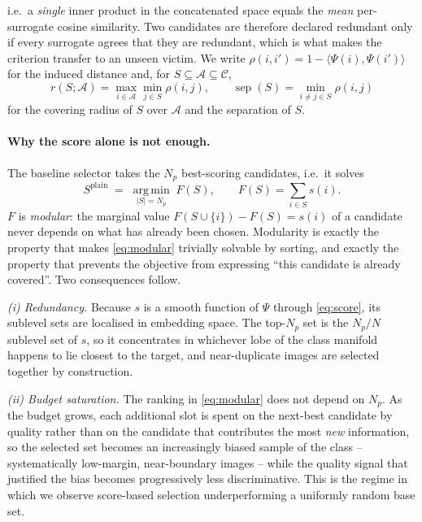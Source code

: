 i.e.\ a \emph{single} inner product in the concatenated space equals the
\emph{mean} per-surrogate cosine similarity.  Two candidates are therefore
declared redundant only if every surrogate agrees that they are redundant,
which is what makes the criterion transfer to an unseen victim.  We write
$\rho(i,i')=1-\langle\Psi(i),\Psi(i')\rangle$ for the induced distance and,
for $S\subseteq\mathcal{A}\subseteq\mathcal{C}$,
\begin{equation}
  r(S;\mathcal{A})=\max_{i\in\mathcal{A}}\min_{j\in S}\rho(i,j),
  \qquad
  \operatorname{sep}(S)=\min_{i\neq j\in S}\rho(i,j)
  \label{eq:radii}
\end{equation}
for the covering radius of $S$ over $\mathcal{A}$ and the separation of $S$.

\paragraph{Why the score alone is not enough.}
The baseline selector takes the $N_p$ best-scoring candidates, i.e.\ it solves
\begin{equation}
  S^{\mathrm{plain}}\;=\;\operatorname*{arg\,min}_{|S|=N_p}\;F(S),
  \qquad F(S)=\sum_{i\in S}s(i).
  \label{eq:modular}
\end{equation}
$F$ is \emph{modular}: the marginal value $F(S\cup\{i\})-F(S)=s(i)$ of a
candidate never depends on what has already been chosen.  Modularity is
exactly the property that makes \eqref{eq:modular} trivially solvable by
sorting, and exactly the property that prevents the objective from expressing
``this candidate is already covered''.  Two consequences follow.

\emph{(i) Redundancy.}  Because $s$ is a smooth function of $\Psi$ through
\eqref{eq:score}, its sublevel sets are localised in embedding space.  The
top-$N_p$ set is the $N_p/N$ sublevel set of $s$, so it concentrates in
whichever lobe of the class manifold happens to lie closest to the target,
and near-duplicate images are selected together by construction.

\emph{(ii) Budget saturation.}  The ranking in \eqref{eq:modular} does not
depend on $N_p$.  As the budget grows, each additional slot is spent on the
next-best candidate by quality rather than on the candidate that contributes
the most \emph{new} information, so the selected set becomes an increasingly
biased sample of the class -- systematically low-margin, near-boundary images
-- while the quality signal that justified the bias becomes progressively less
discriminative.  This is the regime in which we observe score-based selection
underperforming a uniformly random base set.

